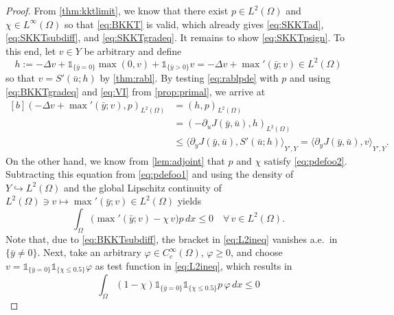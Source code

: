 \documentclass[reqno]{shinyart}
\begin{document}
\begin{proof}
    From \cref{thm:kktlimit}, we know that there exist $p\in L^2(\Omega)$ and $\chi\in L^\infty(\Omega)$ 
    so that \eqref{eq:BKKT} is valid, which already gives \eqref{eq:SKKTad}, \eqref{eq:SKKTsubdiff}, and \eqref{eq:SKKTgradeq}. 
    It remains to show \eqref{eq:SKKTpsign}. To this end, let $v\in Y$ be arbitrary and define 
    \begin{equation}\label{eq:rablpde}
        h := -\Delta v + \mathbb{1}_{\{\bar{y}=0\}} \max(0,v) + \mathbb{1}_{\{\bar{y}>0\}} v 
        = -\Delta v + {\max\nolimits}'(\bar{y};v) \in L^2(\Omega)
    \end{equation}
    so that $v = S'(\bar{u};h)$ by \cref{thm:rabl}. 
    By testing \eqref{eq:rablpde} with $p$ and using \eqref{eq:BKKTgradeq}
    and \eqref{eq:VI} from \cref{prop:primal}, we arrive at
    \begin{equation}\label{eq:pdefoo1}
        \begin{aligned}[b]
            (-\Delta v + {\max\nolimits}'(\bar{y};v) ,  p)_{L^2(\Omega)}
            & = (h, p)_{L^2(\Omega)} \\
            & = (-\partial_u J(\bar{y}, \bar{u}), h)_{L^2(\Omega)}\\
            & \leq {\langle {\partial_y J(\bar{y}, \bar{u})} , {S'(\bar{u};h)} \rangle}_{Y', Y} 
            = {\langle {\partial_y J(\bar{y}, \bar{u})} , {v} \rangle}_{Y', Y}.
        \end{aligned}
    \end{equation}
    On the other hand, we know from \cref{lem:adjoint} that $p$ and $\chi$ satisfy \eqref{eq:pdefoo2}.
    Subtracting this equation from \eqref{eq:pdefoo1} and using the density of $Y {\hookrightarrow} L^2(\Omega)$ 
    and the global Lipschitz continuity of $L^2(\Omega) \ni v \mapsto {\max\nolimits}'(\bar{y};v) \in L^2(\Omega)$ yields
    \begin{equation}\label{eq:L2ineq}
        \int_\Omega \big( {\max\nolimits}'(\bar{y}; v) - \chi\, v \big) p\,dx \leq 0 
        \quad \forall\, v \in L^2(\Omega).
    \end{equation}  
    Note that, due to \eqref{eq:BKKTsubdiff}, the bracket in \eqref{eq:L2ineq} vanishes a.e.\ in $\{\bar{y}\neq 0\}$. 
    Next, take an arbitrary $\varphi \in C^\infty_c(\Omega)$, $\varphi \geq 0$, and choose 
    $v = \mathbb{1}_{\{\bar{y} = 0\}} \mathbb{1}_{\{\chi \leq 0.5\}} \varphi$
    as test function in \eqref{eq:L2ineq}, which results in 
    \begin{equation*}
        \int_\Omega (1 - \chi) \mathbb{1}_{\{\bar{y} = 0\}} \mathbb{1}_{\{\chi \leq 0.5\}} p \,\varphi \,dx \leq 0 

\end{equation*}
\end{proof}
\end{document}
